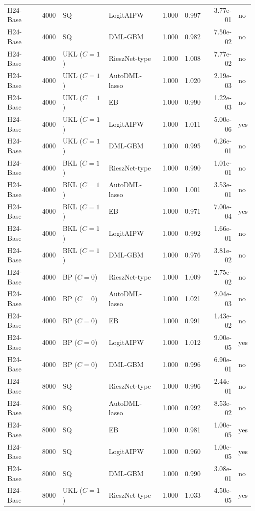 \begin{tabular}{lrllrrrl}
H24-Base & 4000 & SQ & LogitAIPW & 1.000 & 0.997 & 3.77e-01 & no \\
H24-Base & 4000 & SQ & DML-GBM & 1.000 & 0.982 & 7.50e-02 & no \\
H24-Base & 4000 & UKL ($C=1$) & RieszNet-type & 1.000 & 1.008 & 7.77e-02 & no \\
H24-Base & 4000 & UKL ($C=1$) & AutoDML-lasso & 1.000 & 1.020 & 2.19e-03 & no \\
H24-Base & 4000 & UKL ($C=1$) & EB & 1.000 & 0.990 & 1.22e-03 & no \\
H24-Base & 4000 & UKL ($C=1$) & LogitAIPW & 1.000 & 1.011 & 5.00e-06 & yes \\
H24-Base & 4000 & UKL ($C=1$) & DML-GBM & 1.000 & 0.995 & 6.26e-01 & no \\
H24-Base & 4000 & BKL ($C=1$) & RieszNet-type & 1.000 & 0.990 & 1.01e-01 & no \\
H24-Base & 4000 & BKL ($C=1$) & AutoDML-lasso & 1.000 & 1.001 & 3.53e-01 & no \\
H24-Base & 4000 & BKL ($C=1$) & EB & 1.000 & 0.971 & 7.00e-04 & yes \\
H24-Base & 4000 & BKL ($C=1$) & LogitAIPW & 1.000 & 0.992 & 1.66e-01 & no \\
H24-Base & 4000 & BKL ($C=1$) & DML-GBM & 1.000 & 0.976 & 3.81e-02 & no \\
H24-Base & 4000 & BP ($C=0$) & RieszNet-type & 1.000 & 1.009 & 2.75e-02 & no \\
H24-Base & 4000 & BP ($C=0$) & AutoDML-lasso & 1.000 & 1.021 & 2.04e-03 & no \\
H24-Base & 4000 & BP ($C=0$) & EB & 1.000 & 0.991 & 1.43e-02 & no \\
H24-Base & 4000 & BP ($C=0$) & LogitAIPW & 1.000 & 1.012 & 9.00e-05 & yes \\
H24-Base & 4000 & BP ($C=0$) & DML-GBM & 1.000 & 0.996 & 6.90e-01 & no \\
H24-Base & 8000 & SQ & RieszNet-type & 1.000 & 0.996 & 2.44e-01 & no \\
H24-Base & 8000 & SQ & AutoDML-lasso & 1.000 & 0.992 & 8.53e-02 & no \\
H24-Base & 8000 & SQ & EB & 1.000 & 0.981 & 1.00e-05 & yes \\
H24-Base & 8000 & SQ & LogitAIPW & 1.000 & 0.960 & 1.00e-05 & yes \\
H24-Base & 8000 & SQ & DML-GBM & 1.000 & 0.990 & 3.08e-01 & no \\
H24-Base & 8000 & UKL ($C=1$) & RieszNet-type & 1.000 & 1.033 & 4.50e-05 & yes \\

\end{tabular}
